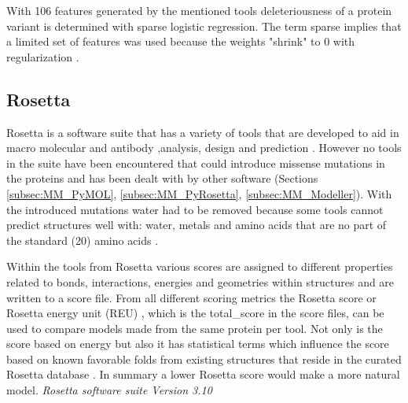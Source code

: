 With 106 features generated by the mentioned tools deleteriousness of a protein variant is determined with sparse logistic regression. The term sparse implies that a limited set of features was used because the weights "shrink" to 0 with regularization \cite{baugh_supplementary:_2016}.
\label{subsec:MM_VIPUR}

\subsection{Rosetta}
Rosetta is a software suite that has a variety of tools that are developed to aid in macro molecular and antibody ,analysis, design and prediction \cite{rosetta_commons_about_nodate}.
However no tools in the suite have been encountered that could introduce missense mutations in the proteins and has been dealt with by other software (Sections \ref{subsec:MM_PyMOL}, \ref{subsec:MM_PyRosetta}, \ref{subsec:MM_Modeller}). With the introduced mutations water had to be removed because some tools cannot predict structures well with: water, metals and amino acids that are no part of the standard (20) amino acids \cite{rosetta_commons_how_nodate}.

Within the tools from Rosetta various scores are assigned to different properties related to bonds, interactions, energies and geometries within structures and are written to a score file. From all different scoring metrics the Rosetta score or Rosetta energy unit (REU) , which is the total\_score in the score files, can be used to compare models made from the same protein per tool. Not only is the score based on energy but also it has statistical terms which influence the score based on known favorable folds from existing structures that reside in the curated Rosetta database \cite{shourya_scoring_nodate}. In summary a lower Rosetta score would make a more natural model.
\label{subsec:MM_Rosetta}
\newline
\textit{Rosetta software suite Version 3.10}

